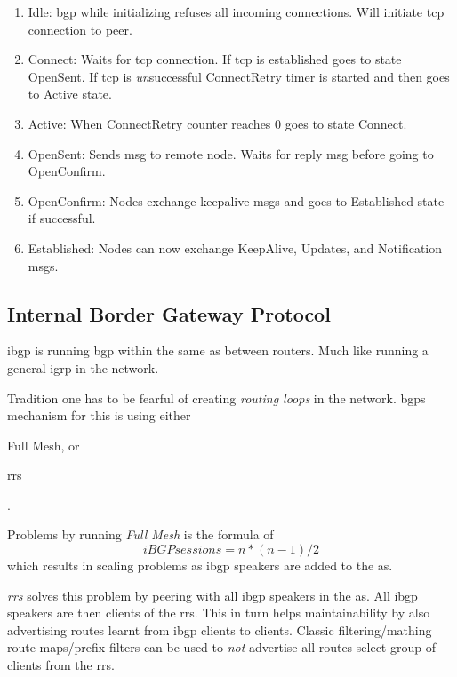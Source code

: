 \begin{enumerate}
    \item Idle: \gls{bgp} while initializing refuses all incoming connections. Will initiate \gls{tcp} connection to peer.
    \item Connect: Waits for \gls{tcp} connection. If \gls{tcp} is established goes to state OpenSent. If \gls{tcp} is \textit{un}successful ConnectRetry timer is started and then goes to Active state.
    \item Active: When ConnectRetry counter reaches 0 goes to state Connect.
    \item OpenSent: Sends \gls{msg} to remote node. Waits for reply \gls{msg} before going to OpenConfirm.
    \item OpenConfirm: Nodes exchange keepalive \glspl{msg} and goes to Established state if successful.
    \item Established: Nodes can now exchange KeepAlive, Updates, and Notification \glspl{msg}.
\end{enumerate}

\subsection[iBGP]{Internal Border Gateway Protocol}

\gls{ibgp} is running \gls{bgp} within the same \gls{as} between routers. Much like running a general \gls{igrp} in the network.

Tradition one has to be fearful of creating \textit{routing loops} in the network. \glspl{bgp} mechanism for this is using either \begin{mylist} \item Full Mesh, or \item \glspl{rr} \end{mylist}.

Problems by running \textit{Full Mesh} is the formula of \[ iBGPsessions = n*(n-1)/2 \]  which results in scaling problems as \gls{ibgp} speakers are added to the \gls{as}.

\textit{\glspl{rr}} solves this problem by peering with all \gls{ibgp} speakers in the \gls{as}. All \gls{ibgp} speakers are then clients of the \glspl{rr}. This in turn helps maintainability by also advertising routes learnt from \gls{ibgp} clients to clients. Classic filtering/mathing route-maps/prefix-filters can be used to \textit{not} advertise all routes select group of clients from the \glspl{rr}.

